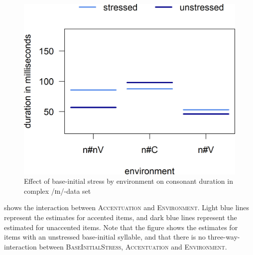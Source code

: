  	\begin{figure}

 		
 		\includegraphics [scale=0.5] {images/Experiment/InModelInterEnvStress}
		
 		\caption{Effect of base-initial stress by environment on consonant duration in complex /ɪn/-data set}		
 		\label{fig:Env Stress In experiment}

 	\end{figure}%
 	
 	
 

 shows the interaction between \textsc{Accentuation} and \textsc{Environment}. Light blue lines represent the estimates for accented items, and dark blue lines represent the estimated for unaccented items. Note that the figure shows the estimates for items with an unstressed base-initial syllable, and that there is no three-way-interaction between \textsc{BaseInitialStress}, \textsc{Accentuation} and \textsc{Environment}. 


	


